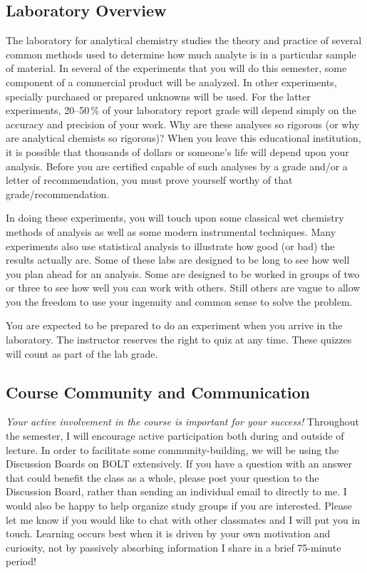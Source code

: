 \documentclass[11pt,letterpaper]{article}
\begin{document}
\subsection{Laboratory Overview}

The laboratory for analytical chemistry studies the theory and practice of
several common methods used to determine how much analyte is in a particular
sample of material. In several of the experiments that you will do this
semester, some component of a commercial product will be analyzed. In other
experiments, specially purchased or prepared unknowns will be used. For the
latter experiments, 20--50\,\% of your laboratory report grade will
depend simply on the accuracy and precision of your work. Why are these analyses
so rigorous (or why are analytical chemists so rigorous)? When you leave this
educational institution, it is possible that thousands of dollars or someone's
life will depend upon your analysis. Before you are certified capable of such
analyses by a grade and/or a letter of recommendation, you must prove yourself
worthy of that grade/recommendation.

In doing these experiments, you will touch upon some classical wet chemistry
methods of analysis as well as some modern instrumental techniques. Many
experiments also use statistical analysis to illustrate how good (or bad)
the results actually are. Some of these labs are designed to be long to see how
well you plan ahead for an analysis. Some are designed to be worked in groups of
two or three to see how well you can work with others. Still others are vague to
allow you the freedom to use your ingenuity and common sense to solve the
problem.

You are expected to be prepared to do an experiment when you arrive in the
laboratory. The instructor reserves the right to quiz at any time. These
quizzes will count as part of the lab grade.

\subsection{Course Community and Communication}
\emph{Your active involvement in the course is important for your success!}
Throughout the semester, I will encourage active participation both during and
outside of lecture. In order to facilitate some community-building, we will be
using the Discussion Boards on BOLT extensively. If you have a question with an
answer that could benefit the class as a whole, please post your question to the
Discussion Board, rather than sending an individual email to directly to me. I
would also be happy to help organize study groups if you are interested. Please
let me know if you would like to chat with other classmates and I will put you
in touch. Learning occurs best when it is driven by your own motivation and
curiosity, not by passively absorbing information I share in a brief 75-minute
period!
\end{document}
